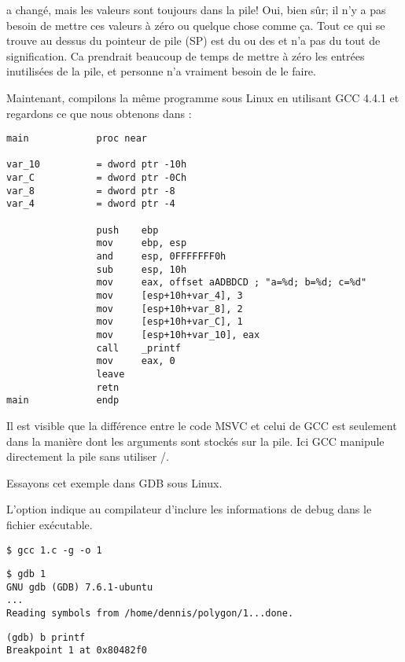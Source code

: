 \ESP a changé, mais les valeurs sont toujours dans la pile!
Oui, bien sûr; il n'y a pas besoin de mettre ces valeurs à zéro ou quelque chose
comme ça.
Tout ce qui se trouve au dessus du pointeur de pile (\ac{SP}) est du 
ou des  et n'a pas du tout de signification.
Ca prendrait beaucoup de temps de mettre à zéro les entrées inutilisées de la
pile, et personne n'a vraiment besoin de le faire.


Maintenant, compilons la même programme sous Linux en utilisant GCC 4.4.1 et regardons
ce que nous obtenons dans \IDA:

\begin{lstlisting}[style=customasmx86]
main            proc near

var_10          = dword ptr -10h
var_C           = dword ptr -0Ch
var_8           = dword ptr -8
var_4           = dword ptr -4

                push    ebp
                mov     ebp, esp
                and     esp, 0FFFFFFF0h
                sub     esp, 10h
                mov     eax, offset aADBDCD ; "a=%d; b=%d; c=%d"
                mov     [esp+10h+var_4], 3
                mov     [esp+10h+var_8], 2
                mov     [esp+10h+var_C], 1
                mov     [esp+10h+var_10], eax
                call    _printf
                mov     eax, 0
                leave
                retn
main            endp
\end{lstlisting}

Il est visible que la différence entre le code MSVC et celui de GCC est seulement
dans la manière dont les arguments sont stockés sur la pile.
Ici GCC manipule directement la pile sans utiliser \PUSH/\POP.


Essayons cet exemple dans \ac{GDB} sous Linux.

L'option  indique au compilateur d'inclure les informations de debug dans
le fichier exécutable.

\begin{lstlisting}
$ gcc 1.c -g -o 1
\end{lstlisting}

\begin{lstlisting}
$ gdb 1
GNU gdb (GDB) 7.6.1-ubuntu
...
Reading symbols from /home/dennis/polygon/1...done.
\end{lstlisting}

\begin{lstlisting}[caption=let's set breakpoint on \printf]
(gdb) b printf
Breakpoint 1 at 0x80482f0
\end{lstlisting}

